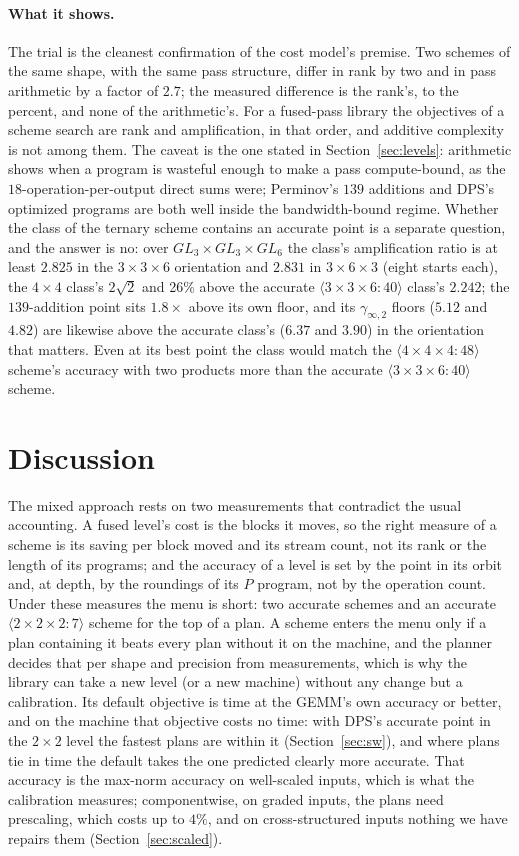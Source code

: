 \documentclass[11pt]{article}
\newcommand{\mm}[1]{\langle #1\rangle}
\newcommand{\ginf}{\gamma_{\infty,2}}
\begin{document}
\paragraph{What it shows.}
The trial is the cleanest confirmation of the cost model's premise.  Two
schemes of the same shape, with the same pass structure, differ in rank by
two and in pass arithmetic by a factor of $2.7$; the measured difference is
the rank's, to the percent, and none of the arithmetic's.  For a fused-pass
library the objectives of a scheme search are rank and amplification, in
that order, and additive complexity is not among them.  The caveat is the
one stated in Section~\ref{sec:levels}: arithmetic shows when a program is
wasteful enough to make a pass compute-bound, as the $18$-operation-per-output
direct sums were; Perminov's $139$ additions and DPS's optimized programs are
both well inside the bandwidth-bound regime.  Whether the class of the
ternary scheme contains an accurate point is a separate question, and the
answer is no: over $GL_3\times GL_3\times GL_6$ the class's amplification
ratio is at least
$2.825$ in the $3\times3\times6$ orientation and $2.831$ in $3\times6\times3$
(eight starts each), the $4\times4$ class's $2\sqrt2$ and 26\% above the
accurate $\mm{3\times3\times6:40}$ class's $2.242$; the $139$-addition point
sits $1.8\times$ above its own floor, and its $\ginf$ floors ($5.12$ and $4.82$)
are likewise above the accurate class's ($6.37$ and $3.90$) in the orientation
that matters.  Even at its best point the class would match the
$\mm{4\times4\times4:48}$ scheme's accuracy with two products more than the accurate
$\mm{3\times3\times6:40}$ scheme.

\section{Discussion}\label{sec:disc}

The mixed approach rests on two measurements that contradict the usual
accounting.  A fused level's cost is the blocks it moves, so the right
measure of a scheme is its saving per block moved and its stream count, not
its rank or the length of its programs; and the accuracy of a level is set by
the point in its orbit and, at depth, by the roundings of its $P$ program,
not by the operation count.  Under these measures the menu is short: two
accurate schemes and an accurate $\mm{2\times2\times2:7}$ scheme for the top of a plan.  A
scheme enters the menu only if a plan containing it beats every plan without
it on the machine, and the planner decides that per shape and precision from
measurements, which is why the library can take a new level (or a new machine) without
any change but a calibration.  Its default objective is time at the GEMM's
own accuracy or better, and on the machine that objective costs no time:
with DPS's accurate point in the $2\times2$ level the fastest plans are
within it (Section~\ref{sec:sw}), and where plans tie in time the default
takes the one predicted clearly more accurate.  That accuracy is the
max-norm accuracy on well-scaled inputs, which is what the calibration
measures; componentwise, on graded inputs, the plans need prescaling, which
costs up to $4\%$, and on cross-structured inputs nothing we have repairs them
(Section~\ref{sec:scaled}).
\end{document}

